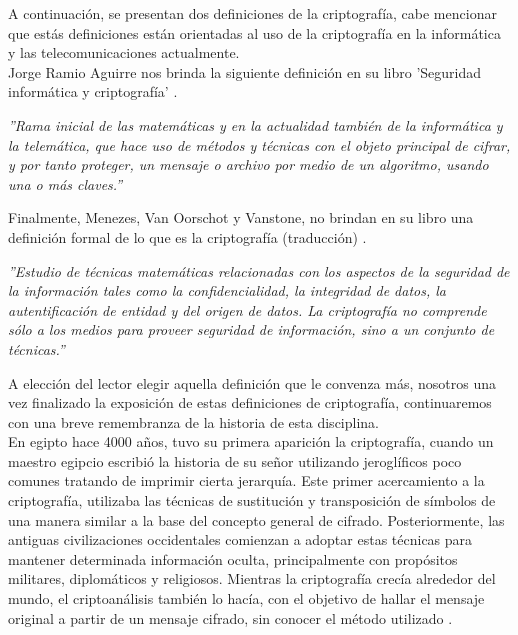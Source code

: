 \documentclass[12pt, a4paper, titlepage]{report}
\begin{document}
                A continuación, se presentan dos definiciones de la criptografía, cabe mencionar que estás definiciones están orientadas al uso de la criptografía en la informática y las telecomunicaciones actualmente.\\
                Jorge Ramio Aguirre nos brinda la siguiente definición en su libro 'Seguridad informática y criptografía' \cite{refRamioAguirre}.
                \begin{center}
                    \textit{''Rama inicial de las matemáticas y en la actualidad también de la informática y la telemática, que hace uso de métodos y técnicas con el objeto principal de cifrar, y por tanto proteger, un mensaje o archivo por medio de un algoritmo, usando una o más claves.''}
                \end{center}
                Finalmente, Menezes, Van Oorschot y Vanstone, no brindan en su libro una definición formal de lo que es la criptografía (traducción) \cite{refHandBookOfAppliedCryptography}.
                \begin{center}
                    \textit{''Estudio de técnicas matemáticas relacionadas con los aspectos de la seguridad de la información tales como la confidencialidad, la integridad de datos, la autentificación de entidad y del origen de datos. La criptografía no comprende sólo a los medios para proveer seguridad de información, sino a un conjunto de técnicas.''}
                \end{center}
                A elección del lector elegir aquella definición que le convenza más, nosotros una vez finalizado la exposición de estas definiciones de criptografía, continuaremos con una breve remembranza de la historia de esta disciplina.\\
                
                En egipto hace 4000 años, tuvo su primera aparición la criptografía, cuando un maestro egipcio escribió la historia de su señor utilizando jeroglíficos poco comunes tratando de imprimir cierta jerarquía. Este primer acercamiento a la criptografía, utilizaba las técnicas de sustitución y transposición de símbolos de una manera similar a la base del concepto general de cifrado. Posteriormente, las antiguas civilizaciones occidentales comienzan a adoptar estas técnicas para mantener determinada información oculta, principalmente con propósitos militares, diplomáticos y religiosos. Mientras la criptografía crecía alrededor del mundo, el criptoanálisis también lo hacía, con el objetivo de hallar el mensaje original a partir de un mensaje cifrado, sin conocer el método utilizado \cite{refSandra} \cite{refCriptografia}.\\
                
\end{document}
